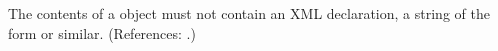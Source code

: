 The contents of a \Notes object must not contain an XML declaration, \ie
a string of the form  or
similar.  (References: .)
